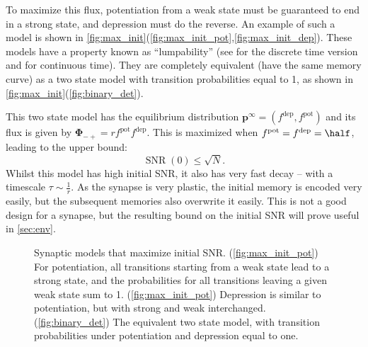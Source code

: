 \documentclass{article} %
\DeclareMathOperator{\snr}{SNR}
\newcommand{\pr}{\mathbf{p}}
\newcommand{\eq}{\pr^\infty}
\newcommand{\F}{\boldsymbol{\Phi}}
\newcommand{\pot}{^{\text{pot}}}
\newcommand{\dep}{^{\text{dep}}}
\begin{document}
To maximize this flux, potentiation from a weak state must be guaranteed to end in a strong state, and depression must do the reverse.
An example of such a model is shown in \autoref{fig:max_init}(\ref{fig:max_init_pot},\ref{fig:max_init_dep}).
These models have a property known as ``lumpability'' (see \cite[\S6.3]{kemeny1960finite} for the discrete time version and \cite{burke1958markovian,Ball1993Lumpability} for continuous time).
They are completely equivalent (\ie have the same memory curve) as a two state model with transition probabilities equal to 1, as shown in \autoref{fig:max_init}(\ref{fig:binary_det}).

This two state model has the equilibrium distribution $\eq=(f\dep,f\pot)$ and its flux is given by $\F_{-+} = rf\pot f\dep$.
This is maximized when $f\pot=f\dep=\half$, leading to the upper bound:
%
\begin{equation}\label{eq:max_init}
  \snr(0) \leq \sqrt{N}.
\end{equation}
%
Whilst this model has high initial SNR, it also has very fast decay -- with a timescale $\tau\sim\frac{1}{r}$.
As the synapse is very plastic, the initial memory is encoded very easily, but the subsequent memories also overwrite it easily.
This is not a good design for a synapse, but the resulting bound on the initial SNR will prove useful in \autoref{sec:env}.

\begin{figure}[tbp]
 \begin{center}
 \begin{myenuma}
  \item\hp{}\label{fig:max_init_pot}\hp
  \item{}\label{fig:max_init_dep}\hp
  \item\hp{}\label{fig:binary_det}
  \end{myenuma}
 \end{center}
  \caption{Synaptic models that maximize initial SNR.
  (\ref{fig:max_init_pot}) For potentiation, all transitions starting from a weak state lead to a strong state, and the probabilities for all transitions leaving a given weak state sum to 1.
  (\ref{fig:max_init_pot}) Depression is similar to potentiation, but with strong and weak interchanged.
  (\ref{fig:binary_det}) The equivalent two state model, with transition probabilities under potentiation and depression equal to one.
  }\label{fig:max_init}
\end{figure}
\end{document}
